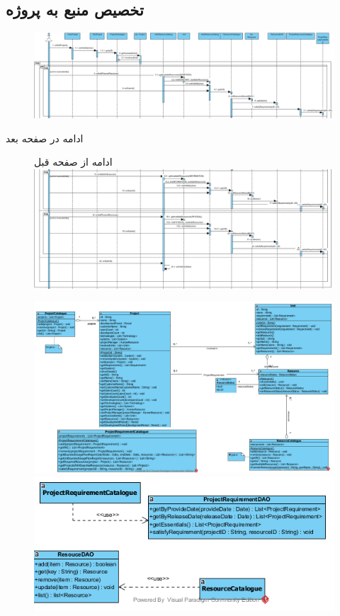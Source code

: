 \begin{landscape}
\section{تخصیص منبع به پروژه}
\begin{figure}[H]
	\centering
	\includegraphics[scale=0.5]{img/sequence-design/AllocateResourceToProject-1}
\end{figure}
ادامه در صفحه بعد \\
\begin{figure}[H]
ادامه از صفحه قبل\\
	\includegraphics[scale=0.5]{img/sequence-design/AllocateResourceToProject-2}
\end{figure}
\begin{figure}[H]
	\centering
	\includegraphics[scale=0.7]{img/sequence-design/AllocateResourceToProjectC}
	\includegraphics[scale=0.7]{img/sequence-design/AllocateResourceToProjectD}

\end{figure}
\end{landscape}
